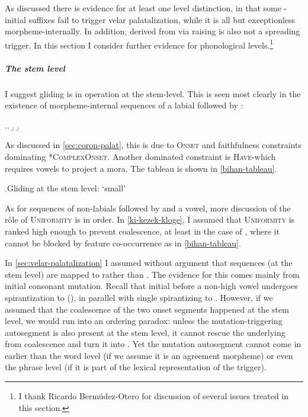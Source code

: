 As discussed there is evidence for at least one level distinction, in that some \ipa{[i]}-initial suffixes fail to trigger velar palatalization, while it is all but exceptionless morpheme-internally. In addition, \ipa{[i]} derived from \ipa{[e]} via raising is also not a spreading trigger. In this section I consider further evidence for phonological levels.\footnote{I thank Ricardo Bermúdez-Otero for discussion of several issues treated in this section.}

\subparagraph{The stem level}
\label{sec:stem-level}

I suggest gliding is in operation at the stem-level. This is seen most clearly in the existence of morpheme-internal sequences of a labial followed by \ipa{[j]}:

\ex.\a.
\b.
\b.

As discussed in \cref{sec:coron-palat}, this is due to \textsc{Onset} and faithfulness constraints dominating *\textsc{ComplexOnset}. Another dominated constraint is \textsc{Have}-\mo[V] which requires vowels to project a mora. The tableau is shown in \cref{bihan-tableau}.

\ex.\label{bihan-tableau}Gliding at the stem level: \ipa{[ˈbjan]} `small'\\
\begin{OTtableau}{5}
\OTcandrow{[b$_{1}$i$_{2}$.an]}{,,,*!,}
\OTcandrow[\OThand]{[ˈb$_{1}$j$_{2}$an]}{,,,,*}
\OTcandrow{[ˈ\us{v,ɡ,i}$_{1,2}$an]}{*!,,,,}
\OTcandrow{[ˈb$_{1,2}$an]}{,*!,,,}
\OTcandrow{[ˈdʒ$_{1,2}$an]}{,,*!,,}
\end{OTtableau}

As for sequences of non-labials followed by \ipa{[i]} and a vowel, more discussion of the rôle of \textsc{Uniformity} is in order. In \ref{ki-kezek-kloge}, I assumed that \textsc{Uniformity} is ranked high enough to prevent coalescence, at least in the case of , where it cannot be blocked by feature co\hyp occurrence as in \ref{bihan-tableau}.

In \cref{sec:velar-palatalization} I assumed without argument that  sequences (at the stem level) are mapped to \ipa{[kjV]} rather than \ipa{[ʧV]}. The evidence for this comes mainly from initial consonant mutation. Recall that initial \ipa{[ʧ]} before a non-high vowel undergoes spirantization to \ipa{[hj]} (), in parallel with single  spirantizing to \ipa{[h]}. However, if we assumed that the coalescence of the two onset segments happened at the stem level, we would run into an ordering paradox: unless the mutation-triggering autosegment is also present at the stem level, it cannot rescue the underlying \ipa{[k]} from coalescence and turn it into \ipa{[h]}. Yet the mutation autosegment cannot come in earlier than the word level (if we assume it is an agreement morpheme) or even the phrase level (if it is part of the lexical representation of the trigger).

